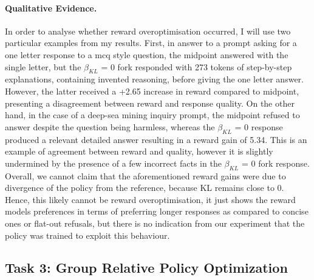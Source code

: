 \documentclass{article}
\begin{document}
\paragraph{Qualitative Evidence.}\label{subsubsec:results-t2-qualitative}
 In order to analyse whether reward overoptimisation occurred, I will use two particular examples from my results. First, in answer to a prompt asking for a one letter response to a mcq style question, the midpoint answered with the single letter, but the $\beta_{KL}$ = 0 fork responded with 273 tokens of step-by-step explanations, containing invented reasoning, before giving the one letter answer. However, the latter received a +2.65 increase in reward compared to midpoint, presenting a disagreement between reward and response quality. On the other hand, in the case of a deep-sea mining inquiry prompt, the midpoint refused to answer despite the question being harmless, whereas the $\beta_{KL}$ = 0  response produced a relevant detailed answer resulting in a reward gain of 5.34. This is an example of agreement between reward and quality, however it is slightly undermined by the presence of a few incorrect facts in the $\beta_{KL}$ = 0 fork response.
Overall, we cannot claim that the aforementioned reward gains were due to divergence of the policy from the reference, because KL remains close to 0. Hence, this likely cannot be reward overoptimisation, it just shows the reward models preferences in terms of preferring longer responses as compared to concise ones or flat-out refusals, but there is no indication from our experiment that the policy was trained to exploit this behaviour. 




\subsection{Task 3: Group Relative Policy Optimization}
\label{subsec:results-task3}
\end{document}
